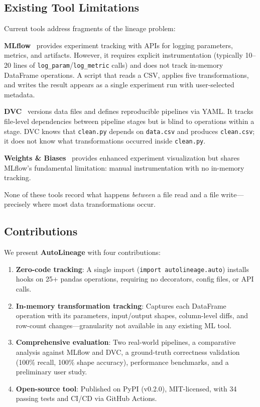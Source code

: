 \documentclass[10pt,twocolumn]{article}
\begin{document}
\subsection{Existing Tool Limitations}

Current tools address fragments of the lineage problem:

\textbf{MLflow}~\cite{zaharia2018} provides experiment tracking with APIs for logging parameters, metrics, and artifacts. However, it requires explicit instrumentation (typically 10--20 lines of \texttt{log\_param}/\texttt{log\_metric} calls) and does not track in-memory DataFrame operations. A script that reads a CSV, applies five transformations, and writes the result appears as a single experiment run with user-selected metadata.

\textbf{DVC}~\cite{kuprieiev2021} versions data files and defines reproducible pipelines via YAML. It tracks file-level dependencies between pipeline stages but is blind to operations within a stage. DVC knows that \texttt{clean.py} depends on \texttt{data.csv} and produces \texttt{clean.csv}; it does not know what transformations occurred inside \texttt{clean.py}.

\textbf{Weights \& Biases}~\cite{wandb2020} provides enhanced experiment visualization but shares MLflow's fundamental limitation: manual instrumentation with no in-memory tracking.

None of these tools record what happens \emph{between} a file read and a file write---precisely where most data transformations occur.

\subsection{Contributions}

We present \textbf{AutoLineage} with four contributions:

\begin{enumerate}[leftmargin=*, nosep]
  \item \textbf{Zero-code tracking}: A single import (\texttt{import autolineage.auto}) installs hooks on 25+ pandas operations, requiring no decorators, config files, or API calls.
  
  \item \textbf{In-memory transformation tracking}: Captures each DataFrame operation with its parameters, input/output shapes, column-level diffs, and row-count changes---granularity not available in any existing ML tool.
  
  \item \textbf{Comprehensive evaluation}: Two real-world pipelines, a comparative analysis against MLflow and DVC, a ground-truth correctness validation (100\% recall, 100\% shape accuracy), performance benchmarks, and a preliminary user study.
  
  \item \textbf{Open-source tool}: Published on PyPI (v0.2.0), MIT-licensed, with 34 passing tests and CI/CD via GitHub Actions.
\end{enumerate}
\end{document}
